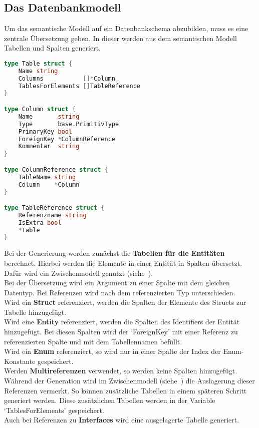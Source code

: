 \documentclass[./einleitung.tex]{subfiles}
\begin{document}
    \subsection{Das Datenbankmodell}\label{subsec:das-datenbankmodell}
    Um das semantische Modell auf ein Datenbankschema abzubilden, muss es eine zentrale Übersetzung geben.
    In dieser werden aus dem semantischen Modell Tabellen und Spalten generiert.
    \begin{lstlisting}[language=Go, captio=Datenstruktur für Tabellen und Spalten, label=lst:tableColumn]
type Table struct {
	Name string
	Columns           []*Column
	TablesForElements []TableReference
}

type Column struct {
	Name       string
	Type       base.PrimitivType
	PrimaryKey bool
	ForeignKey *ColumnReference
	Kommentar  string
}

type ColumnReference struct {
	TableName string
	Column    *Column
}

type TableReference struct {
	Referenzname string
	IsExtra bool
	*Table
}
    \end{lstlisting}
    Bei der Generierung werden zunächst die \textbf{Tabellen für die Entitäten} berechnet.
    Hierbei werden die Elemente in einer Entität in Spalten übersetzt.
    Dafür wird ein Zwischenmodell genutzt (siehe~).\\
    Bei der Übersetzung wird ein Argument zu einer Spalte mit dem gleichen Datentyp.
    Bei Referenzen wird nach dem referenzierten Typ unterschieden.\\
    Wird ein \textbf{Struct} referenziert, werden die Spalten der Elemente des Structs zur Tabelle hinzugefügt.\\
    Wird eine \textbf{Entity} referenziert, werden die Spalten des Identifiers der Entität hinzugefügt.
    Bei diesen Spalten wird der `ForeignKey' mit einer Referenz zu referenzierten Spalte und mit dem Tabellennamen befüllt.\\
    Wird ein \textbf{Enum} referenziert, so wird nur in einer Spalte der Index der Enum-Konstante gespeichert.\\
    Werden \textbf{Multireferenzen} verwendet, so werden keine Spalten hinzugefügt.
    Während der Generation wird im Zwischenmodell (siehe~) die Auslagerung dieser Referenzen vermerkt.
    So können zusätzliche Tabellen in einem späteren Schritt generiert werden.
    Diese zusätzlichen Tabellen werden in der Variable `TablesForElements' gespeichert.\\
    Auch bei Referenzen zu \textbf{Interfaces} wird eine ausgelagerte Tabelle generiert.
\end{document}

